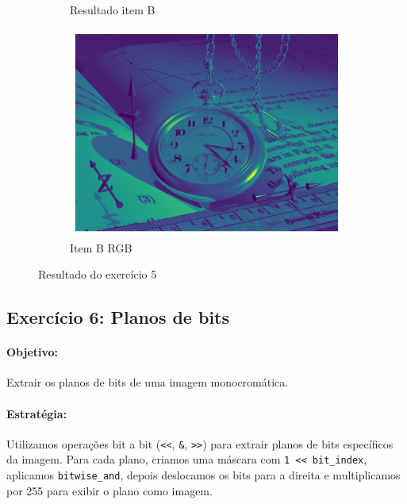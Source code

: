 \documentclass[12pt,a4paper]{report}
\begin{document}
\begin{figure}[H]
\begin{subfigure}[b]{0.3\textwidth}
        \caption{Resultado item B}
    \end{subfigure}
    \hfill
    \begin{subfigure}[b]{0.3\textwidth}
        \includegraphics[width=\textwidth]{imagens/ex5-rgb.png}
        \caption{Item B RGB}
        \label{fig:ex5_rgb}
    \end{subfigure}
    \caption{Resultado do exercício 5}
\end{figure}


\subsection{Exercício 6: Planos de bits}
\paragraph{Objetivo:} 
Extrair os planos de bits de uma imagem monocromática.

\paragraph{Estratégia:} 
Utilizamos operações bit a bit (\texttt{<<}, \texttt{\&}, \texttt{>>}) para extrair planos de bits específicos da imagem. Para cada plano, criamos uma máscara com \texttt{1 << bit\_index}, aplicamos \texttt{bitwise\_and}, depois deslocamos os bits para a direita e multiplicamos por 255 para exibir o plano como imagem.
\end{document}
